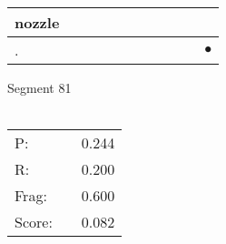 \documentclass[landscape]{article}
\newcommand{\ssp}{\hspace{2pt}}
\newcommand{\mex}{\cellcolor{g}$\bullet$}
\begin{document}
\begin{tabular}{|l|p{10pt}|p{10pt}|p{10pt}|p{10pt}|p{10pt}|p{10pt}|p{10pt}|p{10pt}|p{10pt}|p{10pt}|}
\hline
\ssp nozzle \ssp&\hspace{2pt}&\hspace{2pt}&\hspace{2pt}&\hspace{2pt}&\hspace{2pt}&\hspace{2pt}&\hspace{2pt}&\hspace{2pt}&\hspace{2pt}&\hspace{2pt}\\
\hline
\ssp \cellcolor{ref9}. \ssp&\hspace{2pt}&\hspace{2pt}&\hspace{2pt}&\hspace{2pt}&\hspace{2pt}&\hspace{2pt}&\hspace{2pt}&\hspace{2pt}&\hspace{2pt}&\hspace{2pt}\mex\\
\hline
\end{tabular}

\vspace{6pt}
\noindent Segment 81\\\\
\noindent\begin{tabular}{lm{12pt}r}
\hline
P:&&0.244\\
R:&&0.200\\
Frag:&&0.600\\
Score:&&0.082\\
\end{tabular}

\newpage
\end{document}
